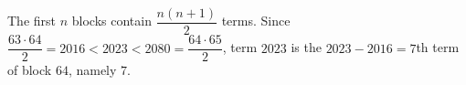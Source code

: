 The first $n$ blocks contain $\dfrac{n(n+1)}2$ terms. Since $\dfrac{63\cdot64}2=2016<2023<2080=\dfrac{64\cdot65}2$, term $2023$ is the $2023-2016=7$th term of block $64$, namely $\boxed{7}$.
